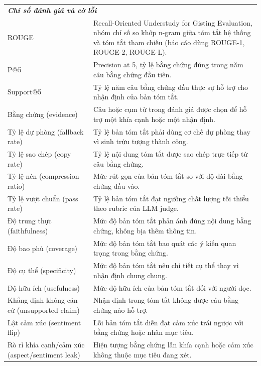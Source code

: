 \documentclass[12pt,a4paper]{report}
\begin{document}
\begin{longtable}{p{} p{}}
\multicolumn{2}{l}{\textit{\textbf{Chỉ số đánh giá và cờ lỗi}}} \\
\addlinespace[2pt]
ROUGE & Recall-Oriented Understudy for Gisting Evaluation, nhóm chỉ số so khớp n-gram giữa tóm tắt hệ thống và tóm tắt tham chiếu (báo cáo dùng ROUGE-1, ROUGE-2, ROUGE-L). \\
P@5 & Precision at 5, tỷ lệ bằng chứng đúng trong năm câu bằng chứng đầu tiên. \\
Support@5 & Tỷ lệ năm câu bằng chứng đầu thực sự hỗ trợ cho nhận định của bản tóm tắt. \\
Bằng chứng (evidence) & Câu hoặc cụm từ trong đánh giá được chọn để hỗ trợ một khía cạnh hoặc một nhận định. \\
Tỷ lệ dự phòng (fallback rate) & Tỷ lệ bản tóm tắt phải dùng cơ chế dự phòng thay vì sinh trừu tượng thành công. \\
Tỷ lệ sao chép (copy rate) & Tỷ lệ nội dung tóm tắt được sao chép trực tiếp từ câu bằng chứng. \\
Tỷ lệ nén (compression ratio) & Mức rút gọn của bản tóm tắt so với độ dài bằng chứng đầu vào. \\
Tỷ lệ vượt chuẩn (pass rate) & Tỷ lệ bản tóm tắt đạt ngưỡng chất lượng tối thiểu theo rubric của LLM judge. \\
Độ trung thực (faithfulness) & Mức độ bản tóm tắt phản ánh đúng nội dung bằng chứng, không bịa thêm thông tin. \\
Độ bao phủ (coverage) & Mức độ bản tóm tắt bao quát các ý kiến quan trọng trong bằng chứng. \\
Độ cụ thể (specificity) & Mức độ bản tóm tắt nêu chi tiết cụ thể thay vì nhận định chung chung. \\
Độ hữu ích (usefulness) & Mức độ hữu ích của bản tóm tắt đối với người đọc. \\
Khẳng định không căn cứ (unsupported claim) & Nhận định trong tóm tắt không được câu bằng chứng nào hỗ trợ. \\
Lật cảm xúc (sentiment flip) & Lỗi bản tóm tắt diễn đạt cảm xúc trái ngược với bằng chứng hoặc nhãn mục tiêu. \\
Rò rỉ khía cạnh/cảm xúc (aspect/sentiment leak) & Hiện tượng bằng chứng lẫn khía cạnh hoặc cảm xúc không thuộc mục tiêu đang xét. \\
\end{longtable}
\renewcommand{\arraystretch}{1.0}

\clearpage

\end{document}
